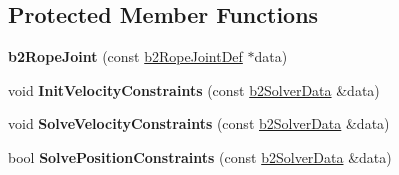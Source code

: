 \subsection*{Protected Member Functions}
\begin{DoxyCompactItemize}
\item 
{\bfseries b2\+Rope\+Joint} (const \hyperlink{structb2_rope_joint_def}{b2\+Rope\+Joint\+Def} $\ast$data)\hypertarget{classb2_rope_joint_a3f69f238616d8dc622d9448f81e14e53}{}\label{classb2_rope_joint_a3f69f238616d8dc622d9448f81e14e53}

\item 
void {\bfseries Init\+Velocity\+Constraints} (const \hyperlink{structb2_solver_data}{b2\+Solver\+Data} \&data)\hypertarget{classb2_rope_joint_a8146dad7f839f1285ab596661c3a84fa}{}\label{classb2_rope_joint_a8146dad7f839f1285ab596661c3a84fa}

\item 
void {\bfseries Solve\+Velocity\+Constraints} (const \hyperlink{structb2_solver_data}{b2\+Solver\+Data} \&data)\hypertarget{classb2_rope_joint_ab3e9a866833f5ad079473ece272d3c88}{}\label{classb2_rope_joint_ab3e9a866833f5ad079473ece272d3c88}

\item 
bool {\bfseries Solve\+Position\+Constraints} (const \hyperlink{structb2_solver_data}{b2\+Solver\+Data} \&data)\hypertarget{classb2_rope_joint_a50794029b91cd469b0598fe25a77948f}{}\label{classb2_rope_joint_a50794029b91cd469b0598fe25a77948f}

\end{DoxyCompactItemize}
